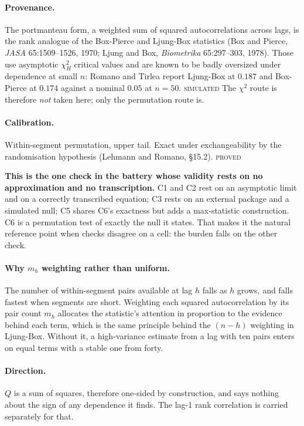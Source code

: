 \documentclass[11pt,a4paper]{article}
\newcommand{\PROVED}{\textsc{\textcolor{blue!55!black}{proved}}}
\newcommand{\SIMULATED}{\textsc{\textcolor{orange!70!black}{simulated}}}
\begin{document}
\paragraph{Provenance.} The portmanteau form, a weighted sum of squared
autocorrelations across lags, is the rank analogue of the Box-Pierce and Ljung-Box
statistics (Box and Pierce, \emph{JASA} 65:1509--1526, 1970; Ljung and Box,
\emph{Biometrika} 65:297--303, 1978). Those use asymptotic $\chi^2_H$ critical values and
are known to be badly oversized under dependence at small $n$: Romano and Tirlea report
Ljung-Box at $0.187$ and Box-Pierce at $0.174$ against a nominal $0.05$ at $n=50$.
\SIMULATED{} The $\chi^2$ route is therefore \emph{not} taken here; only the permutation
route is.

\paragraph{Calibration.} Within-segment permutation, upper tail. Exact under
exchangeability by the randomisation hypothesis (Lehmann and Romano, \S 15.2). \PROVED

\textbf{This is the one check in the battery whose validity rests on no approximation and
no transcription.} C1 and C2 rest on an asymptotic limit and on a correctly transcribed
equation; C3 rests on an external package and a simulated null; C5 shares C6's exactness
but adds a max-statistic construction. C6 is a permutation test of exactly the null it
states. That makes it the natural reference point when checks disagree on a cell: the
burden falls on the other check.

\paragraph{Why $m_h$ weighting rather than uniform.} The number of within-segment pairs
available at lag $h$ falls as $h$ grows, and falls fastest when segments are short.
Weighting each squared autocorrelation by its pair count $m_h$ allocates the statistic's
attention in proportion to the evidence behind each term, which is the same principle
behind the $(n-h)$ weighting in Ljung-Box. Without it, a high-variance estimate from a
lag with ten pairs enters on equal terms with a stable one from forty.

\paragraph{Direction.} $Q$ is a sum of squares, therefore one-sided by construction, and
says nothing about the sign of any dependence it finds. The lag-1 rank correlation is
carried separately for that.
\end{document}
